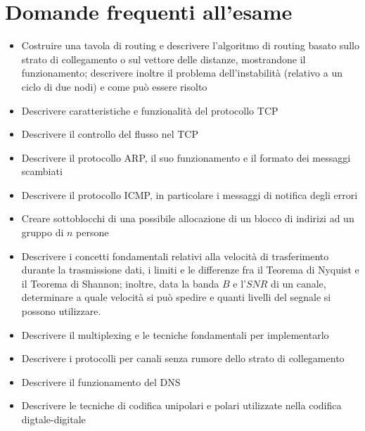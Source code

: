 \section{Domande frequenti all'esame}

\begin{itemize}
    \item
    Costruire una tavola di routing e descrivere l'algoritmo di routing basato sullo strato di collegamento o sul vettore delle distanze, mostrandone il funzionamento; descrivere inoltre il problema dell'instabilità (relativo a un ciclo di due nodi) e come può essere risolto
    
    \item
    Descrivere caratteristiche e funzionalità del protocollo TCP
    
    \item
    Descrivere il controllo del flusso nel TCP
    
    \item
    Descrivere il protocollo ARP, il suo funzionamento e il formato dei messaggi scambiati
    
    \item
    Descrivere il protocollo ICMP, in particolare i messaggi di notifica degli errori
    
    \item
    Creare sottoblocchi di una possibile allocazione di un blocco di indirizi ad un gruppo di $n$ persone
    
    \item
    Descrivere i concetti fondamentali relativi alla velocità di trasferimento durante la trasmissione dati, i limiti e le differenze fra il Teorema di Nyquist e il Teorema di Shannon; inoltre, data la banda $B$ e l'$SNR$ di un canale, determinare a quale velocità si può spedire e quanti livelli del segnale si possono utilizzare. 
    
    \item
    Descrivere il multiplexing e le tecniche fondamentali per implementarlo
    
    \item
    Descrivere i protocolli per canali senza rumore dello strato di collegamento
    
    \item
    Descrivere il funzionamento del DNS
    
    \item
    Descrivere le tecniche di codifica unipolari e polari utilizzate nella codifica digtale-digitale
    

\end{itemize}
